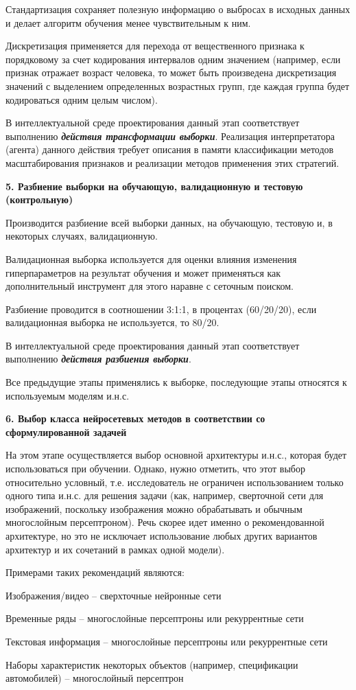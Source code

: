 Стандартизация сохраняет полезную информацию о выбросах в исходных данных и делает алгоритм обучения менее чувствительным к ним.

Дискретизация применяется для перехода от вещественного признака к порядковому за счет кодирования интервалов одним значением (например, если признак отражает возраст человека, то может быть произведена дискретизация значений с выделением определенных возрастных групп, где каждая группа будет кодироваться одним целым числом).

В интеллектуальной среде проектирования данный этап соответствует выполнению \textbf{\textit{действия трансформации выборки}}. Реализация интерпретатора (агента) данного действия требует описания в памяти классификации методов масштабирования признаков и реализации методов применения этих стратегий.


\textbf{5. Разбиение выборки на обучающую, валидационную и тестовую (контрольную)}

Производится разбиение всей выборки данных, на обучающую, тестовую и, в некоторых случаях, валидационную.

Валидационная выборка используется для оценки влияния изменения гиперпараметров на результат обучения и может применяться как дополнительный инструмент для этого наравне с сеточным поиском.

Разбиение проводится в соотношении 3:1:1, в процентах (60/20/20), если валидационная выборка не используется, то 80/20.

В интеллектуальной среде проектирования данный этап соответствует выполнению \textbf{\textit{действия разбиения выборки}}.

Все предыдущие этапы применялись к выборке, последующие этапы относятся к используемым моделям и.н.с.


\textbf{6. Выбор класса нейросетевых методов в соответствии со сформулированной задачей}

На этом этапе осуществляется выбор основной архитектуры и.н.с., которая будет использоваться при обучении. Однако, нужно отметить, что этот выбор относительно условный, т.е. исследователь не ограничен использованием только одного типа и.н.с. для решения задачи (как, например, сверточной сети для изображений, поскольку изображения можно обрабатывать и обычным многослойным персептроном). Речь скорее идет именно о рекомендованной архитектуре, но это не исключает использование любых других вариантов архитектур и их сочетаний в рамках одной модели).

Примерами таких рекомендаций являются:
\begin{textitemize}
	\item Изображения/видео -- сверхточные нейронные сети
	\item Временные ряды -- многослойные персептроны или рекуррентные сети
	\item Текстовая информация -- многослойные персептроны или рекуррентные сети
	\item Наборы характеристик некоторых объектов (например, спецификации автомобилей) -- многослойный персептрон
\end{textitemize}

